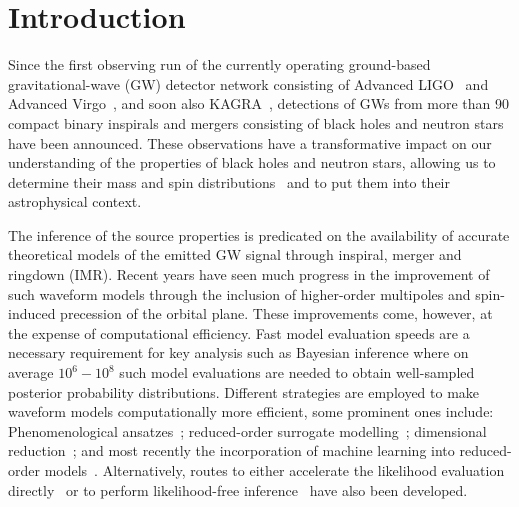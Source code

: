 \documentclass[prd,amssymb,amsmath,amsfonts,superscriptaddress,nofootinbib,reprint,showpacs, longbibliography]{revtex4-1}
\begin{document}
\maketitle 

\section{Introduction}
\label{sec:Introduction}
Since the first observing run of the currently operating ground-based gravitational-wave (GW) detector network consisting of Advanced LIGO~\cite{LIGOScientific:2014pky} and Advanced Virgo~\cite{VIRGO:2014yos}, and soon also KAGRA~\cite{KAGRA:2020tym}, detections of GWs from more than 90 compact binary inspirals and mergers consisting of black holes and neutron stars~\cite{LIGOScientific:2018mvr, LIGOScientific:2020ibl, LIGOScientific:2021usb, LIGOScientific:2021djp} have been announced. These observations have a transformative impact on our understanding of the properties of black holes and neutron stars, allowing us to determine their mass and spin distributions~\cite{LIGOScientific:2021psn} and to put them into their astrophysical context. 

The inference of the source properties is predicated on the availability of accurate theoretical models of the emitted GW signal through inspiral, merger and ringdown (IMR). Recent years have seen much progress in the improvement of such waveform models through the inclusion of higher-order multipoles and spin-induced precession of the orbital plane. These improvements come, however, at the expense of computational efficiency. Fast model evaluation speeds are a necessary requirement for key analysis such as Bayesian inference where on average $10^6-10^8$ such model evaluations are needed to obtain well-sampled posterior probability distributions. Different strategies are employed to make waveform models computationally more efficient, some prominent ones include: Phenomenological ansatzes~\cite{Pratten:2020fqn}; reduced-order surrogate modelling~\cite{Field:2011mf,Field:2013cfa,Purrer:2014fza,Blackman:2015pia,Blackman:2017dfb,Galley:2016mvy,Varma:2019csw}; dimensional reduction~\cite{Schmidt:2014iyl,Thomas:2020uqj}; and most recently the incorporation of machine learning into reduced-order models~\cite{Khan:2020fso}. Alternatively, routes to either accelerate the likelihood evaluation directly~\cite{Cornish:2010kf,Canizares:2013ywa,Canizares:2014fya,Smith:2016qas,Zackay:2018qdy,Cornish:2021lje,Leslie:2021ssu,Morisaki:2021ngj} or to perform likelihood-free inference~\cite{Chua:2019wwt,Dax:2021tsq} have also been developed.
\end{document}
